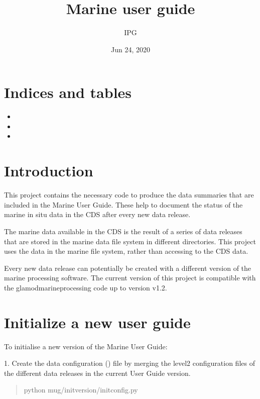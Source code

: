 \documentclass[letterpaper,10pt,english]{sphinxmanual}
\title{Marine user guide}
\date{Jun 24, 2020}
\author{IPG}
\begin{document}
\pagestyle{empty}
\sphinxmaketitle
\pagestyle{plain}
\sphinxtableofcontents
\pagestyle{normal}
\label{\detokenize{index::doc}}



\chapter{Indices and tables}
\label{\detokenize{index:indices-and-tables}}\begin{itemize}
\item {} 

\item {} 

\item {} 

\end{itemize}


\chapter{Introduction}
\label{\detokenize{index:introduction}}
This project contains the necessary code to produce the data summaries that are
included in the Marine User Guide. These help to document the status of the
marine in situ data in the CDS after every new data release.

The marine data available in the CDS is the result of a series of data releases
that are stored in the marine data file system in different directories. This
project uses the data in the marine file system, rather than accessing to the
CDS data.

Every new data release can potentially be created with a different version of
the marine processing software. The current version of this project is
compatible with the glamod\sphinxhyphen{}marine\sphinxhyphen{}processing code up to version v1.2.


\chapter{Initialize a new user guide}
\label{\detokenize{index:initialize-a-new-user-guide}}
To initialise a new version of the Marine User Guide:

1. Create the data configuration () file by merging the level2  configuration files of the different data releases in the current User Guide  version.
\begin{quote}

\begin{sphinxVerbatim}[commandchars=\\\{\}]
python \PYGZlt{}mug\PYGZgt{}/init\PYGZus{}version/init\PYGZus{}config.py
\end{sphinxVerbatim}
\end{quote}
\end{document}
